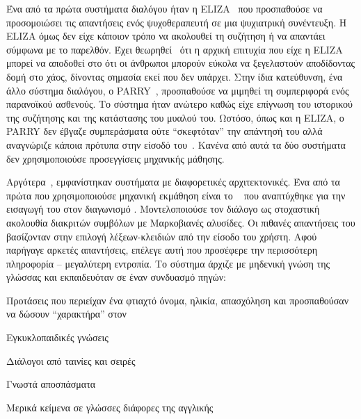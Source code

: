 Ένα από τα πρώτα συστήματα διαλόγου ήταν η ELIZA~\cite{weizenbaum1966eliza} που προσπαθούσε να προσομοιώσει τις απαντήσεις ενός ψυχοθεραπευτή σε μια ψυχιατρική συνέντευξη.
Η ELIZA όμως δεν είχε κάποιον τρόπο να ακολουθεί τη συζήτηση ή να απαντάει σύμφωνα με το παρελθόν.
Έχει θεωρηθεί~\cite{shieber1994lessons} ότι η αρχική επιτυχία που είχε η ELIZA μπορεί να αποδοθεί στο ότι οι άνθρωποι μπορούν εύκολα να ξεγελαστούν αποδίδοντας δομή στο χάος, δίνοντας σημασία εκεί που δεν υπάρχει.
Στην ίδια κατεύθυνση, ένα άλλο σύστημα διαλόγου, ο PARRY~\cite{colby1981modeling}, προσπαθούσε να μιμηθεί τη συμπεριφορά ενός παρανοϊκού ασθενούς.
Το σύστημα ήταν ανώτερο καθώς είχε επίγνωση του ιστορικού της συζήτησης και της κατάστασης του μυαλού του.
Ωστόσο, όπως και η ELIZA, ο PARRY δεν έβγαζε συμπεράσματα ούτε \enquote{σκεφτόταν} την απάντησή του αλλά αναγνώριζε κάποια πρότυπα στην είσοδό του~\cite{colby1974ten}.
Κανένα από αυτά τα δύο συστήματα δεν χρησιμοποιούσε προσεγγίσεις μηχανικής μάθησης.

Αργότερα~\cite{shawar2007chatbots,serban2015survey}, εμφανίστηκαν συστήματα με διαφορετικές αρχιτεκτονικές.
Ένα από τα πρώτα που χρησιμοποιούσε μηχανική εκμάθηση είναι το ~\cite{hutchens1998introducing} που αναπτύχθηκε για την εισαγωγή του στον διαγωνισμό .
Μοντελοποιούσε τον διάλογο ως στοχαστική ακολουθία διακριτών συμβόλων με Μαρκοβιανές αλυσίδες.
Οι πιθανές απαντήσεις του  βασίζονταν στην επιλογή λέξεων-κλειδιών από την είσοδο του χρήστη.
Αφού παρήγαγε αρκετές απαντήσεις, επέλεγε αυτή που προσέφερε την περισσότερη πληροφορία -- μεγαλύτερη εντροπία.
Το σύστημα άρχιζε με μηδενική γνώση της γλώσσας και εκπαιδευόταν σε έναν συνδυασμό πηγών:
\begin{compactitem}
    \item Προτάσεις που περιείχαν ένα φτιαχτό όνομα, ηλικία, απασχόληση και προσπαθούσαν να δώσουν \enquote{χαρακτήρα} στον 
    \item Εγκυκλοπαιδικές γνώσεις
    \item Διάλογοι από ταινίες και σειρές
    \item Γνωστά αποσπάσματα
    \item Μερικά κείμενα σε γλώσσες διάφορες της αγγλικής
\end{compactitem}

